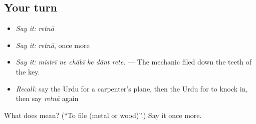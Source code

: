 \subsection*{Your turn}
\begin{itemize}
\raggedright
  \item \emph{Say it:} \emph{retnā}
  \item \emph{Say it:} \emph{retnā}, once more
  \item \emph{Say it:} \emph{mistrī ne chābī ke dānt rete.} — The mechanic filed down the teeth of the key.
  \item \emph{Recall:} say the Urdu for a carpenter's plane, then the Urdu for to knock in, then say \emph{retnā} again
\end{itemize}

\begin{tcolorbox}[breakable,colback=teal!4,colframe=teal!35!black,title={Before you move on}]
What does  mean? (\textquotedblleft{}To file (metal or wood)\textquotedblright{}.) Say it once more.
\end{tcolorbox}
